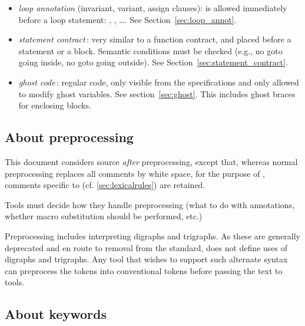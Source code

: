 \begin{itemize}
\begin{itemize}
  \item \emph{loop annotation} (invariant, variant, assign clauses): is
    allowed immediately before a loop statement: \For, \While,
    \Do\ldots \While. See Section~\ref{sec:loop_annot}.

  \item \emph{statement contract}\,: very similar to a function contract, and
    placed before a statement or a block.  Semantic conditions must
    be checked (e.g., no goto going inside, no goto
    going outside).  See Section~\ref{sec:statement_contract}.

  \item \emph{ghost code}\,: regular \lang code, only visible from the
    specifications and only allowed to modify ghost
    variables. See section~\ref{sec:ghost}. This includes ghost braces
    for enclosing blocks.

  \end{itemize}

\end{itemize}



\subsection{About preprocessing}

This document considers \lang source \emph{after} preprocessing, except that, whereas normal preprocessing replaces all comments by white space, 
for the purpose of 
\NAME, comments specific to \NAME (cf. \ref{sec:lexicalrules}) are retained.

Tools must decide how they handle preprocessing (what to do with
annotations, whether macro substitution should be performed, etc.)

Preprocessing includes interpreting \lang digraphs and trigraphs.
As these are generally deprecated and en route to removal from the \lang
standard, \NAME does not define uses of digraphs and trigraphs. Any tool that wishes to support such alternate syntax can preprocess the tokens into conventional tokens before passing the text to \NAME tools.


\subsection{About keywords}

